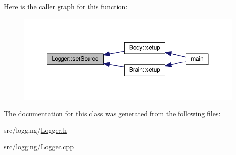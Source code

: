 Here is the caller graph for this function\+:
\nopagebreak
\begin{figure}[H]
\begin{center}
\leavevmode
\includegraphics[width=350pt]{class_logger_a5adf33889fdf061aa0dc756d38eb5e90_icgraph}
\end{center}
\end{figure}




The documentation for this class was generated from the following files\+:\begin{DoxyCompactItemize}
\item 
src/logging/\hyperlink{_logger_8h}{Logger.\+h}\item 
src/logging/\hyperlink{_logger_8cpp}{Logger.\+cpp}\end{DoxyCompactItemize}
